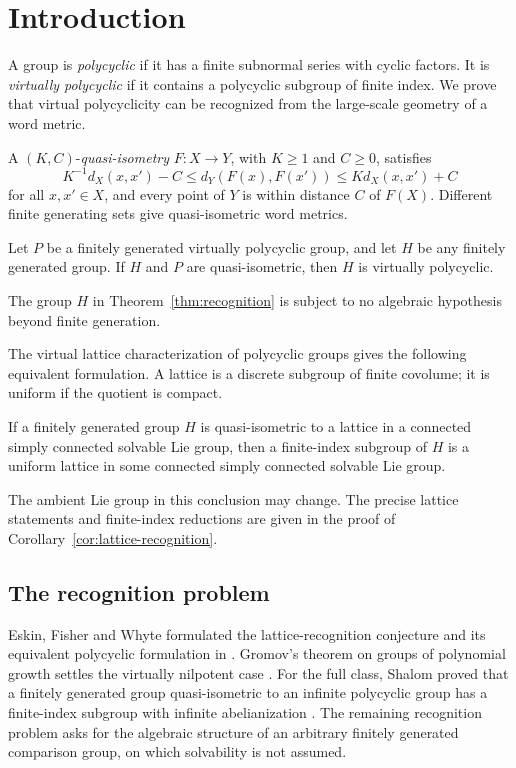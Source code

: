 \section{Introduction}

A group is \emph{polycyclic} if it has a finite subnormal series with cyclic factors. It is \emph{virtually polycyclic} if it contains a polycyclic subgroup of finite index. We prove that virtual polycyclicity can be recognized from the large-scale geometry of a word metric.

A $(K,C)$-\emph{quasi-isometry} $F:X\to Y$, with $K\geq1$ and $C\geq0$, satisfies
\[
 K^{-1}d_X(x,x')-C\leq d_Y(F(x),F(x'))\leq Kd_X(x,x')+C
\]
for all $x,x'\in X$, and every point of $Y$ is within distance $C$ of $F(X)$. Different finite generating sets give quasi-isometric word metrics. 
\begin{theorem}\label{thm:recognition}
Let $P$ be a finitely generated virtually polycyclic group, and let $H$ be any finitely generated group. If $H$ and $P$ are quasi-isometric, then $H$ is virtually polycyclic.
\end{theorem}

The group $H$ in Theorem~\ref{thm:recognition} is subject to no algebraic hypothesis beyond finite generation.

The virtual lattice characterization of polycyclic groups gives the following equivalent formulation. A lattice is a discrete subgroup of finite covolume; it is uniform if the quotient is compact.

\begin{corollary}\label{cor:lattice-recognition}
If a finitely generated group $H$ is quasi-isometric to a lattice in a connected simply connected solvable Lie group, then a finite-index subgroup of $H$ is a uniform lattice in some connected simply connected solvable Lie group.
\end{corollary}

The ambient Lie group in this conclusion may change. The precise lattice statements and finite-index reductions are given in the proof of Corollary~\ref{cor:lattice-recognition}.

\subsection{The recognition problem}

Eskin, Fisher and Whyte formulated the lattice-recognition conjecture
and its equivalent polycyclic formulation in
\cite[Conjecture~1.2 and Remark~(3), p.~929]{EskinFisherWhyte2007}.
Gromov's theorem on groups of polynomial growth settles the virtually
nilpotent case \cite{Gromov1981}. For the full class, Shalom proved that
a finitely generated group quasi-isometric to an infinite polycyclic
group has a finite-index subgroup with infinite abelianization
\cite[Theorem~1.3]{Shalom2004}. The remaining recognition problem asks
for the algebraic structure of an arbitrary finitely generated
comparison group, on which solvability is not assumed.

